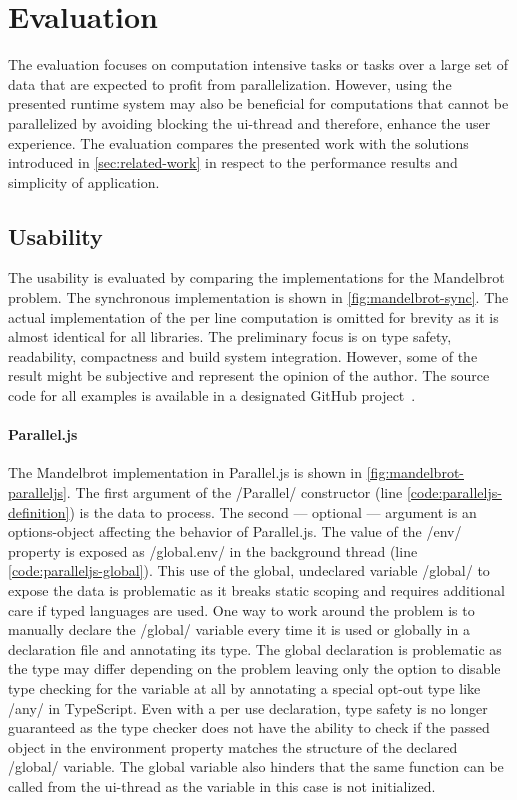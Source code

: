 \section{Evaluation}\label{sec:evaluation}
The evaluation focuses on computation intensive tasks or tasks over a large set of data that are expected to profit from parallelization. However, using the presented runtime system may also be beneficial for computations that cannot be parallelized by avoiding blocking the ui-thread and therefore, enhance the user experience. The evaluation compares the presented work with the solutions introduced in \cref{sec:related-work} in respect to the performance results and simplicity of application. 



\subsection{Usability}
The usability is evaluated by comparing the implementations for the Mandelbrot problem. The synchronous implementation is shown in \cref{fig:mandelbrot-sync}. The actual implementation of the per line computation is omitted for brevity as it is almost identical for all libraries. The preliminary focus is on type safety, readability, compactness and build system integration. However, some of the result might be subjective and represent the opinion of the author. The source code for all examples is available in a designated GitHub project~\cite{Reiser2016}. 

\paragraph{Parallel.js}
The Mandelbrot implementation in Parallel.js is shown in \cref{fig:mandelbrot-paralleljs}. The first argument of the \javascriptinline/Parallel/ constructor (line \ref{code:paralleljs-definition}) is the data to process. The second --- optional ---  argument is an options-object affecting the behavior of Parallel.js. The value of the \javascriptinline/env/ property is exposed as \javascriptinline/global.env/ in the background thread (line \ref{code:paralleljs-global}). This use of the global, undeclared variable \javascriptinline/global/ to expose the data is problematic as it breaks static scoping and requires additional care if typed languages are used. One way to work around the problem is to manually declare the \javascriptinline/global/ variable every time it is used or globally in a declaration file and annotating its type. The global declaration is problematic as the type may differ depending on the problem leaving only the option to disable type checking for the variable at all by annotating a special opt-out type like \javascriptinline/any/ in TypeScript. Even with a per use declaration, type safety is no longer guaranteed as the type checker does not have the ability to check if the passed object in the environment property matches the structure of the declared \javascriptinline/global/ variable. The global variable also hinders that the same function can be called from the ui-thread as the variable in this case is not initialized. 

